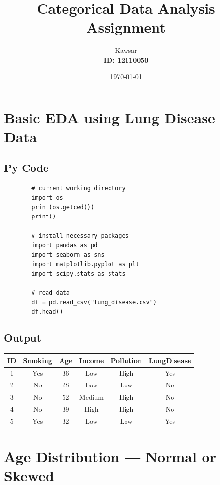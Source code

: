 \documentclass[a4paper,12pt]{article}
\begin{document}
	
	\title{Categorical Data Analysis Assignment}
	\author{Kawsar \\ \textbf{ID: 12110050}}
	\date{\today}
	\maketitle
	
	\tableofcontents
	\newpage

	
	\section{Basic EDA using Lung Disease Data}
	
	\subsection{Py Code}
	\begin{lstlisting}
		# current working directory
		import os
		print(os.getcwd())
		print()
		
		# install necessary packages
		import pandas as pd
		import seaborn as sns
		import matplotlib.pyplot as plt
		import scipy.stats as stats
		
		# read data
		df = pd.read_csv("lung_disease.csv")
		df.head()
	\end{lstlisting}
	
	\subsection{Output}
	\begin{center}
		\begin{tabular}{|c|c|c|c|c|c|}
			\hline
			\textbf{ID} & \textbf{Smoking} & \textbf{Age} & \textbf{Income} & \textbf{Pollution} & \textbf{LungDisease} \\
			\hline
			1 & Yes & 36 & Low & High & Yes \\
			2 & No & 28 & Low & Low & No \\
			3 & No & 52 & Medium & High & No \\
			4 & No & 39 & High & High & No \\
			5 & Yes & 32 & Low & Low & Yes \\
			\hline
		\end{tabular}
	\end{center}
\section{Age Distribution — Normal or Skewed}
\end{document}
